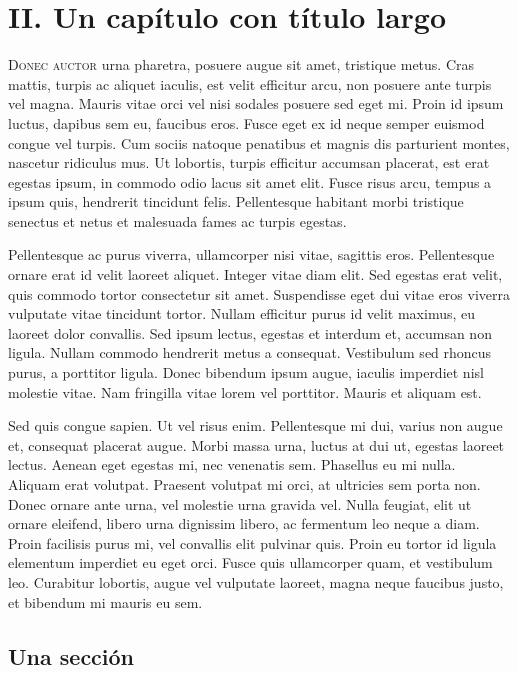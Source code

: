 \chapter*{II. Un capítulo con título largo}

\noindent\textsc{Donec auctor} urna pharetra, posuere augue sit amet, tristique metus. Cras mattis, turpis ac aliquet iaculis, est velit efficitur arcu, non posuere ante turpis vel magna. Mauris vitae orci vel nisi sodales posuere sed eget mi. Proin id ipsum luctus, dapibus sem eu, faucibus eros. Fusce eget ex id neque semper euismod congue vel turpis. Cum sociis natoque penatibus et magnis dis parturient montes, nascetur ridiculus mus. Ut lobortis, turpis efficitur accumsan placerat, est erat egestas ipsum, in commodo odio lacus sit amet elit. Fusce risus arcu, tempus a ipsum quis, hendrerit tincidunt felis. Pellentesque habitant morbi tristique senectus et netus et malesuada fames ac turpis egestas.

Pellentesque ac purus viverra, ullamcorper nisi vitae, sagittis eros. Pellentesque ornare erat id velit laoreet aliquet. Integer vitae diam elit. Sed egestas erat velit, quis commodo tortor consectetur sit amet. Suspendisse eget dui vitae eros viverra vulputate vitae tincidunt tortor. Nullam efficitur purus id velit maximus, eu laoreet dolor convallis. Sed ipsum lectus, egestas et interdum et, accumsan non ligula. Nullam commodo hendrerit metus a consequat. Vestibulum sed rhoncus purus, a porttitor ligula. Donec bibendum ipsum augue, iaculis imperdiet nisl molestie vitae. Nam fringilla vitae lorem vel porttitor. Mauris et aliquam est.

Sed quis congue sapien. Ut vel risus enim. Pellentesque mi dui, varius non augue et, consequat placerat augue. Morbi massa urna, luctus at dui ut, egestas laoreet lectus. Aenean eget egestas mi, nec venenatis sem. Phasellus eu mi nulla. Aliquam erat volutpat. Praesent volutpat mi orci, at ultricies sem porta non. Donec ornare ante urna, vel molestie urna gravida vel. Nulla feugiat, elit ut ornare eleifend, libero urna dignissim libero, ac fermentum leo neque a diam. Proin facilisis purus mi, vel convallis elit pulvinar quis. Proin eu tortor id ligula elementum imperdiet eu eget orci. Fusce quis ullamcorper quam, et vestibulum leo. Curabitur lobortis, augue vel vulputate laoreet, magna neque faucibus justo, et bibendum mi mauris eu sem.

\section*{\large Una sección}

